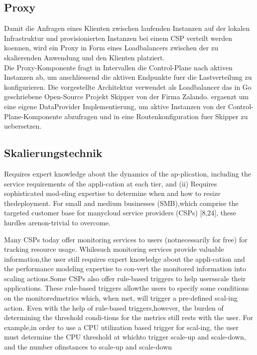 \documentclass[runningheads]{llncs}
\begin{document}
\subsection{Proxy}

Damit die Anfragen eines Klienten zwischen laufenden Instanzen auf der lokalen Infrastruktur und provisionierten Instanzen bei einem CSP verteilt werden koennen, wird ein Proxy in Form eines Loadbalancers zwischen der zu skalierenden Anwendung und den Klienten platziert. \\

Die Proxy-Komponente fragt in Intervallen die Control-Plane nach aktiven Instanzen ab, um anschliessend die aktiven Endpunkte fuer die Lastverteilung zu konfigurieren. Die vorgestellte Architektur verwendet als Loadbalancer das in Go geschriebene Open-Source Projekt Skipper von der Firma Zalando. ergaenzt um eine eigene DataProvider Implementierung, um aktive Instanzen von der Control-Plane-Komponente abzufragen und in eine Routenkonfiguration fuer Skipper zu uebersetzen.

\subsection{Skalierungstechnik} \label{skalierungstechnik}

Requires expert knowledge about the dynamics of the ap-plication, including the service requirements of the appli-cation at each tier, and (ii) Requires sophisticated mod-eling expertise to determine when and how to resize thedeployment. For small and medium businesses (SMB),which comprise the targeted customer base for manycloud service providers (CSPs) [8,24], these hurdles arenon-trivial to overcome.

Many CSPs today offer monitoring services to users (notnecessarily for free) for tracking resource usage. Whilesuch monitoring services provide valuable information,the user still requires expert knowledge about the appli-cation and the performance modeling expertise to con-vert the monitored information into scaling actions.Some CSPs also offer rule-based triggers to help usersscale their applications. These rule-based triggers allowthe users to specify some conditions on the monitoredmetrics which, when met, will trigger a pre-defined scal-ing action.  Even with the help of rule-based triggers,however, the burden of determining the threshold condi-tions for the metrics still rests with the user. For example,in order to use a CPU utilization based trigger for scal-ing, the user must determine the CPU threshold at whichto trigger scale-up and scale-down, and the number ofinstances to scale-up and scale-down
\end{document}

